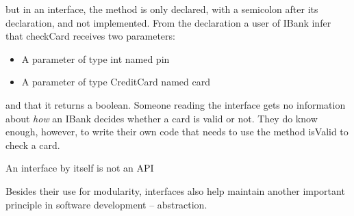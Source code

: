 but in an interface, the method is only declared, with a semicolon after its declaration, and not implemented. From the declaration a user of IBank infer that checkCard receives two parameters:
\begin{itemize}
    \item A parameter of type int named pin
    \item A parameter of type CreditCard named card
\end{itemize}
and that it returns a boolean. Someone reading the interface gets no information about \emph{how} an IBank decides whether a card is valid or not. They do know enough, however, to write their own code that needs to use the method isValid to check a card. 

An interface by itself is not an API



Besides their use for modularity, interfaces also help maintain another important principle in software development -- abstraction.

\begin{definition}

\end{definition}


